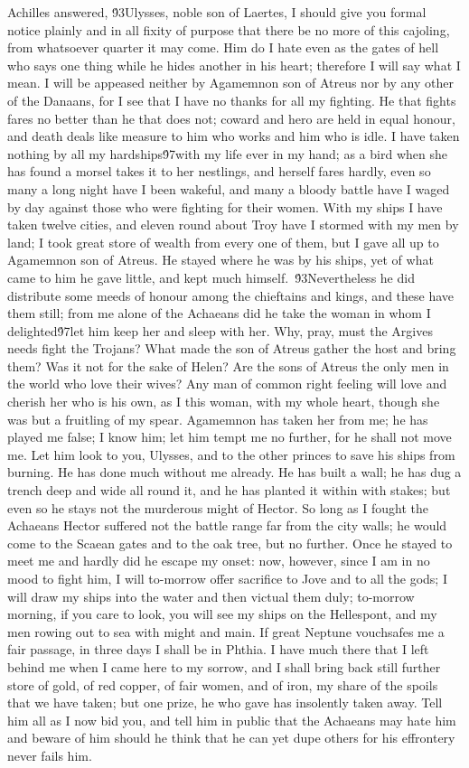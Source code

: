 {Achilles answered, \'93Ulysses, noble son of Laertes, I should give you formal notice plainly and in all fixity of purpose that there be no more of this cajoling, from whatsoever quarter it may come. Him do I hate even as the gates of hell who says one thing while he hides another in his heart; therefore I will say what I mean. I will be appeased neither by Agamemnon son of Atreus nor by any other of the Danaans, for I see that I have no thanks for all my fighting. He that fights fares no better than he that does not; coward and hero are held in equal honour, and death deals like measure to him who works and him who is idle. I have taken nothing by all my hardships\'97with my life ever in my hand; as a bird when she has found a morsel takes it to her nestlings, and herself fares hardly, even so many a long night have I been wakeful, and many a bloody battle have I waged by day against those who were fighting for their women. With my ships I have taken twelve cities, and eleven round about Troy have I stormed with my men by land; I took great store of wealth from every one of them, but I gave all up to Agamemnon son of Atreus. He stayed where he was by his ships, yet of what came to him he gave little, and kept much himself.\
\'93Nevertheless he did distribute some meeds of honour among the chieftains and kings, and these have them still; from me alone of the Achaeans did he take the woman in whom I delighted\'97let him keep her and sleep with her. Why, pray, must the Argives needs fight the Trojans? What made the son of Atreus gather the host and bring them? Was it not for the sake of Helen? Are the sons of Atreus the only men in the world who love their wives? Any man of common right feeling will love and cherish her who is his own, as I this woman, with my whole heart, though she was but a fruitling of my spear. Agamemnon has taken her from me; he has played me false; I know him; let him tempt me no further, for he shall not move me. Let him look to you, Ulysses, and to the other princes to save his ships from burning. He has done much without me already. He has built a wall; he has dug a trench deep and wide all round it, and he has planted it within with stakes; but even so he stays not the murderous might of Hector. So long as I fought the Achaeans Hector suffered not the battle range far from the city walls; he would come to the Scaean gates and to the oak tree, but no further. Once he stayed to meet me and hardly did he escape my onset: now, however, since I am in no mood to fight him, I will to-morrow offer sacrifice to Jove and to all the gods; I will draw my ships into the water and then victual them duly; to-morrow morning, if you care to look, you will see my ships on the Hellespont, and my men rowing out to sea with might and main. If great Neptune vouchsafes me a fair passage, in three days I shall be in Phthia. I have much there that I left behind me when I came here to my sorrow, and I shall bring back still further store of gold, of red copper, of fair women, and of iron, my share of the spoils that we have taken; but one prize, he who gave has insolently taken away. Tell him all as I now bid you, and tell him in public that the Achaeans may hate him and beware of him should he think that he can yet dupe others for his effrontery never fails him.\
}
